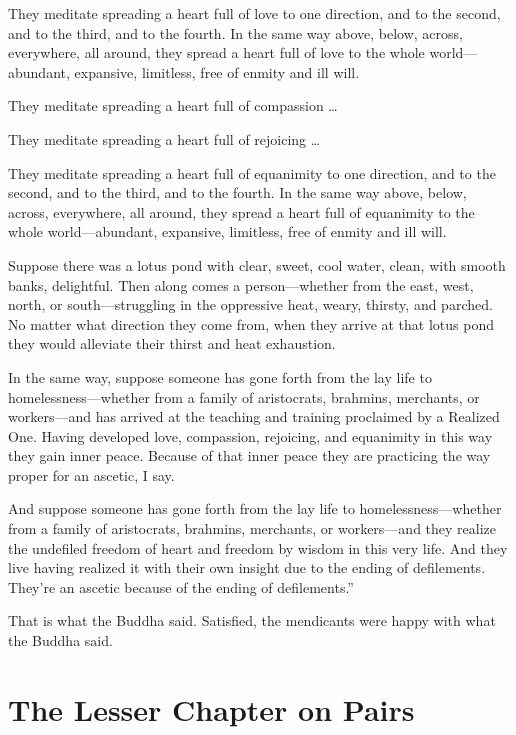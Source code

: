 \documentclass[12pt,openany]{book}%
\let\oldcontentsline\contentsline
\newcommand{\nopagecontentsline}[3]{\oldcontentsline{#1}{#2}{}}
\newcommand*{\tocchapterline}[1]{\bfseries\itshape{#1}}
\begin{document}
They meditate spreading a heart full of love to one direction, and to the second, and to the third, and to the fourth. In the same way above, below, across, everywhere, all around, they spread a heart full of love to the whole world—abundant, expansive, limitless, free of enmity and ill will. 

They meditate spreading a heart full of compassion … 

They meditate spreading a heart full of rejoicing … 

They meditate spreading a heart full of equanimity to one direction, and to the second, and to the third, and to the fourth. In the same way above, below, across, everywhere, all around, they spread a heart full of equanimity to the whole world—abundant, expansive, limitless, free of enmity and ill will. 

Suppose there was a lotus pond with clear, sweet, cool water, clean, with smooth banks, delightful. Then along comes a person—whether from the east, west, north, or south—struggling in the oppressive heat, weary, thirsty, and parched. No matter what direction they come from, when they arrive at that lotus pond they would alleviate their thirst and heat exhaustion. 

In the same way, suppose someone has gone forth from the lay life to homelessness—whether from a family of aristocrats, brahmins, merchants, or workers—and has arrived at the teaching and training proclaimed by a Realized One. Having developed love, compassion, rejoicing, and equanimity in this way they gain inner peace. Because of that inner peace they are practicing the way proper for an ascetic, I say. 

And suppose someone has gone forth from the lay life to homelessness—whether from a family of aristocrats, brahmins, merchants, or workers—and they realize the undefiled freedom of heart and freedom by wisdom in this very life. And they live having realized it with their own insight due to the ending of defilements. They’re an ascetic because of the ending of defilements.” 

That is what the Buddha said. Satisfied, the mendicants were happy with what the Buddha said. 

%
\chapter*{The Lesser Chapter on Pairs}
\addcontentsline{toc}{chapter}{\tocchapterline{The Lesser Chapter on Pairs}}
\addtocontents{toc}{\let\protect\contentsline\protect\oldcontentsline}
\end{document}
